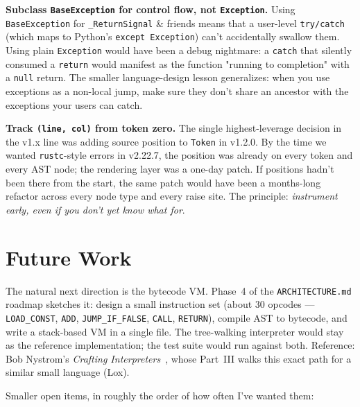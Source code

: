 \documentclass[11pt]{article}
\begin{document}
\textbf{Subclass \texttt{BaseException} for control flow, not \texttt{Exception}.} Using \texttt{BaseException} for \texttt{\_ReturnSignal} \& friends means that a user-level \texttt{try/catch} (which maps to Python's \texttt{except Exception}) can't accidentally swallow them. Using plain \texttt{Exception} would have been a debug nightmare: a \texttt{catch} that silently consumed a \texttt{return} would manifest as the function "running to completion" with a \texttt{null} return. The smaller language-design lesson generalizes: when you use exceptions as a non-local jump, make sure they don't share an ancestor with the exceptions your users can catch.

\textbf{Track \texttt{(line, col)} from token zero.} The single highest-leverage decision in the v1.x line was adding source position to \texttt{Token} in v1.2.0. By the time we wanted \texttt{rustc}-style errors in v2.22.7, the position was already on every token and every AST node; the rendering layer was a one-day patch. If positions hadn't been there from the start, the same patch would have been a months-long refactor across every node type and every raise site. The principle: \emph{instrument early, even if you don't yet know what for}.

\section{Future Work}

The natural next direction is the bytecode VM. Phase~4 of the \texttt{ARCHITECTURE.md} roadmap sketches it: design a small instruction set (about 30 opcodes --- \texttt{LOAD\_CONST}, \texttt{ADD}, \texttt{JUMP\_IF\_FALSE}, \texttt{CALL}, \texttt{RETURN}), compile AST to bytecode, and write a stack-based VM in a single file. The tree-walking interpreter would stay as the reference implementation; the test suite would run against both. Reference: Bob Nystrom's \emph{Crafting Interpreters}~\cite{nystrom2021}, whose Part~III walks this exact path for a similar small language (Lox).

Smaller open items, in roughly the order of how often I've wanted them:
\end{document}
